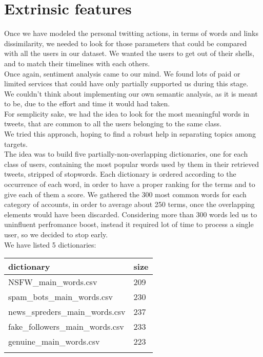 \section{Extrinsic features}
Once we have modeled the personal twitting actions, in terms of words and links dissimilarity, we needed to look for those parameters that could be compared with all the users in our dataset.
We wanted the users to get out of their shells, and to match their timelines with each others.\\
Once again, sentiment analysis came to our mind. We found lots of paid or limited services that could have only partially supported us during this stage.\\
We couldn't think about implementing our own semantic analysis, as it is meant to be, due to the effort and time it would had taken.\\
For semplicity sake, we had the idea to look for the most meaningful words in tweets, that are common to all the users belonging to the same class.\\
We tried this approach, hoping to find a robust help in separating topics among targets.\\
The idea was to build five partially-non-overlapping dictionaries, one for each class of users, containing the most popular words used by them in their retrieved tweets, stripped of stopwords. Each dictionary is ordered according to the occurrence of each word, in order to have a proper ranking for the terms and to give each of them a score.
We gathered the 300 most common words for each category of accounts, in order to average about 250 terms, once the overlapping elements would have been discarded.
Considering more than 300 words led us to uninfluent perfromance boost, instead it required lot of time to process a single user, so we decided to stop early.\\
We have listed 5 dictionaries: 
\small
\begin{center}
	\begin{tabular}{ll}
		\\dictionary&size\\
		\hline\hline
		NSFW\_main\_words.csv&209\\
		spam\_bots\_main\_words.csv&230\\
		news\_spreders\_main\_words.csv&237\\
		fake\_followers\_main\_words.csv&233\\
		genuine\_main\_words.csv&223\\\hline\\
	\end{tabular}
\end{center}
